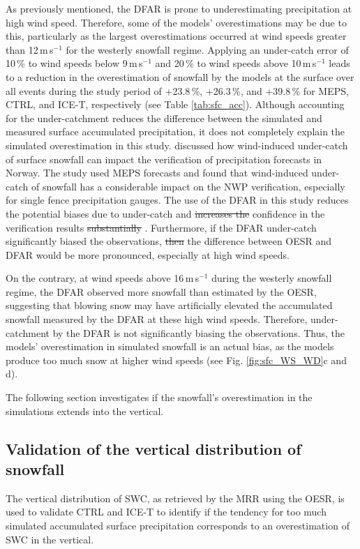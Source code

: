 \documentclass{ametsocV5}
\providecommand{\DIFadd}[1]{{\protect\color{blue}\uwave{#1}}} %
\providecommand{\DIFdel}[1]{{\protect\color{red}\sout{#1}}}                      %
\providecommand{\DIFaddbegin}{} %
\providecommand{\DIFaddend}{} %
\providecommand{\DIFdelbegin}{} %
\providecommand{\DIFdelend}{} %
\newcommand{\DIFscaledelfig}{0.5}
\newlength{\DIFdelgraphicswidth} %
\newlength{\DIFdelgraphicsheight} %
\newcommand{\DIFaddincludegraphics}[2][]{{\color{blue}\fbox{\DIFOincludegraphics[#1]{#2}}}} %
\newcommand{\DIFdelincludegraphics}[2][]{%
\sbox{\DIFdelgraphicsbox}{\DIFOincludegraphics[#1]{#2}}%
\settoboxwidth{\DIFdelgraphicswidth}{\DIFdelgraphicsbox} %
\settoboxtotalheight{\DIFdelgraphicsheight}{\DIFdelgraphicsbox} %
\scalebox{\DIFscaledelfig}{%
\parbox[b]{\DIFdelgraphicswidth}{\usebox{\DIFdelgraphicsbox}\\[-\baselineskip] \rule{\DIFdelgraphicswidth}{0em}}\llap{\resizebox{\DIFdelgraphicswidth}{\DIFdelgraphicsheight}{%
\setlength{\unitlength}{\DIFdelgraphicswidth}%
\begin{picture}(1,1)%
\thicklines\linethickness{2pt} %
{\color[rgb]{1,0,0}\put(0,0){\framebox(1,1){}}}%
{\color[rgb]{1,0,0}\put(0,0){\line( 1,1){1}}}%
{\color[rgb]{1,0,0}\put(0,1){\line(1,-1){1}}}%
\end{picture}%
}\hspace*{3pt}}} %
} %
\DeclareRobustCommand{\DIFaddbegin}{\DIFOaddbegin \let\includegraphics\DIFaddincludegraphics} %
\DeclareRobustCommand{\DIFaddend}{\DIFOaddend \let\includegraphics\DIFOincludegraphics} %
\DeclareRobustCommand{\DIFdelbegin}{\DIFOdelbegin \let\includegraphics\DIFdelincludegraphics} %
\DeclareRobustCommand{\DIFdelend}{\DIFOaddend \let\includegraphics\DIFOincludegraphics} %
\begin{document}
		As previously mentioned, the DFAR is prone to underestimating precipitation at high wind speed. Therefore, some of the models' overestimations may be due to this, particularly as the largest overestimations occurred at wind speeds greater than 12\,m\,s$^{-1}$ for the westerly snowfall regime. Applying an under-catch error of 10\,\% to wind speeds below 9\,m\,s$^{-1}$ and 20\,\% to wind speeds above 10\,m\,s$^{-1}$ leads to a reduction in the overestimation of snowfall by the models at the surface over all events during the study period of +23.8\,\%, +26.3\,\%, and +39.8\,\% for MEPS, CTRL, and ICE-T, respectively (see Table \ref{tab:sfc_acc}). Although accounting for the under-catchment reduces the difference between the simulated and measured surface accumulated precipitation, it does not completely explain the simulated overestimation in this study. \citet{koltzow_verification_2020} discussed how wind-induced under-catch of surface snowfall can impact the verification of precipitation forecasts in Norway. The study used MEPS forecasts and found that wind-induced under-catch of snowfall has a considerable impact on the NWP verification, especially for single fence precipitation gauges. The use of the DFAR in this study reduces the potential biases due to under-catch and \DIFdelbegin \DIFdel{increases the }\DIFdelend \DIFaddbegin \DIFadd{substanially increases }\DIFaddend confidence in the verification results \DIFdelbegin \DIFdel{substantially }\DIFdelend \citep{koltzow_verification_2020}. Furthermore, if the DFAR under-catch significantly biased the observations, \DIFdelbegin \DIFdel{then }\DIFdelend the difference between OESR and DFAR would be more pronounced, especially at high wind speeds. 

		On the contrary, at wind speeds above 16\,m\,s$^{-1}$ during the westerly snowfall regime, the DFAR observed more snowfall than estimated by the OESR, suggesting that blowing snow may have artificially elevated the accumulated snowfall measured by the DFAR at these high wind speeds. Therefore, under-catchment by the DFAR is not significantly biasing the observations. Thus, the models' overestimation in simulated snowfall is an actual bias, as the models produce too much snow at higher wind speeds (see Fig. \ref{fig:sfc_WS_WD}c and d).

		The following section investigates if the snowfall's overestimation in the simulations extends into the vertical.


	\subsection{Validation of the vertical distribution of snowfall}\label{sec:res:swc}
		The vertical distribution of SWC, as retrieved by the MRR using the OESR, is used to validate CTRL and ICE-T to identify if the tendency for too much simulated accumulated surface precipitation corresponds to an overestimation of SWC in the vertical.
\end{document}
